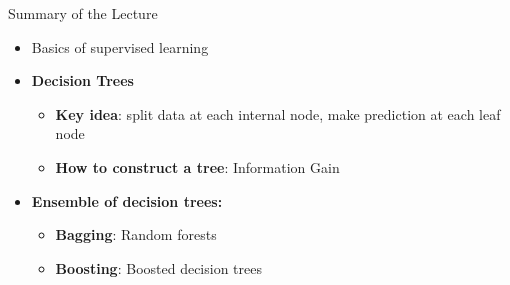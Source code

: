 \begin{frame}{Summary of the Lecture}

\begin{itemize}
    \item Basics of supervised learning

    \item \textbf{Decision Trees}
    \begin{itemize}
        \item \textbf{Key idea}: split data at each internal node, make prediction at each leaf node
        \item \textbf{How to construct a tree}: Information Gain
    \end{itemize}

    \item \textbf{Ensemble of decision trees:}
    \begin{itemize}
        \item \textbf{Bagging}: Random forests
        \item \textbf{Boosting}: Boosted decision trees
    \end{itemize}
\end{itemize}

\end{frame}
